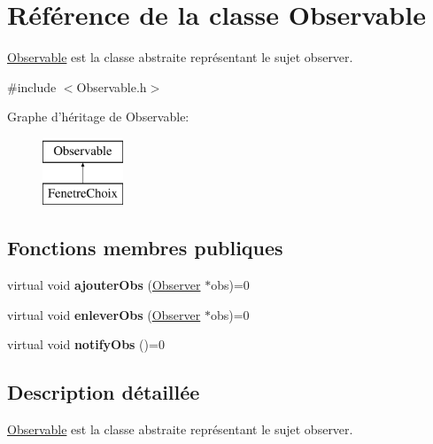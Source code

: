 \hypertarget{classObservable}{\section{\-Référence de la classe \-Observable}
\label{classObservable}
}


\hyperlink{classObservable}{\-Observable} est la classe abstraite représentant le sujet observer.  




{\ttfamily \#include $<$\-Observable.\-h$>$}

\-Graphe d'héritage de \-Observable\-:\begin{figure}[H]
\begin{center}
\leavevmode
\includegraphics[height=2.000000cm]{classObservable}
\end{center}
\end{figure}
\subsection*{\-Fonctions membres publiques}
\begin{DoxyCompactItemize}
\item 
\hypertarget{classObservable_a02a760ccb777fc6b62b94bb9f6ed75ae}{virtual void {\bfseries ajouter\-Obs} (\hyperlink{classObserver}{\-Observer} $\ast$obs)=0}\label{classObservable_a02a760ccb777fc6b62b94bb9f6ed75ae}

\item 
\hypertarget{classObservable_af60bd92dedfc8befac0cc4fab2845846}{virtual void {\bfseries enlever\-Obs} (\hyperlink{classObserver}{\-Observer} $\ast$obs)=0}\label{classObservable_af60bd92dedfc8befac0cc4fab2845846}

\item 
\hypertarget{classObservable_a0ebba92c40eb637c53346e088cd79880}{virtual void {\bfseries notify\-Obs} ()=0}\label{classObservable_a0ebba92c40eb637c53346e088cd79880}

\end{DoxyCompactItemize}


\subsection{\-Description détaillée}
\hyperlink{classObservable}{\-Observable} est la classe abstraite représentant le sujet observer. 

